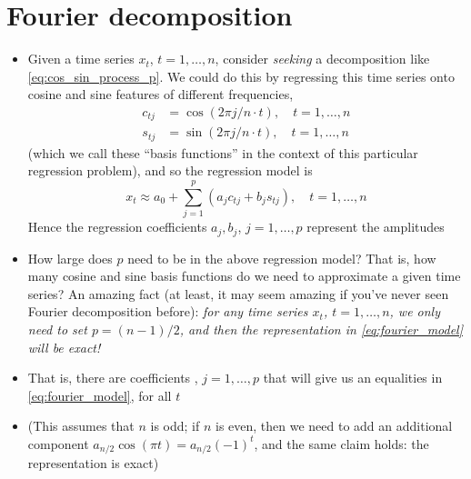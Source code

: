 \documentclass{article}
\begin{document}
\section{Fourier decomposition}

\begin{itemize}
\item Given a time series $x_t$, $t = 1,\dots,n$, consider \emph{seeking} a
  decomposition like \eqref{eq:cos_sin_process_p}. We could do this by
  regressing this time series onto cosine and sine features of different
  frequencies,  
  \begin{align*}
  c_{tj} &= \cos(2\pi j/n \cdot t), \quad t = 1,\dots,n \\
  s_{tj} &= \sin(2\pi j/n \cdot t), \quad t = 1,\dots,n
  \end{align*}
  (which we call these ``basis functions'' in the context of this particular
  regression problem), and so the regression model is 
  \begin{equation}
  \label{eq:fourier_model}
  x_t \approx a_0 + \sum_{j=1}^p (a_j c_{tj} + b_j s_{tj}), \quad t = 1,\dots,n 
  \end{equation}
  Hence the regression coefficients $a_j,b_j$, $j = 1,\dots,p$ represent the 
  amplitudes 

\item How large does $p$ need to be in the above regression model? That is, how
  many cosine and sine basis functions do we need to approximate a given time
  series? An amazing fact (at least, it may seem amazing if you've never seen
  Fourier decomposition before): \emph{for any time series $x_t$, $t =
    1,\dots,n$, we only need to set $p = (n-1)/2$, and then the representation
    in \eqref{eq:fourier_model} will be exact!}    

\item That is, there are coefficients , $j =
  1,\dots,p$ that will give us an equalities in \eqref{eq:fourier_model}, for
  all $t$  

\item (This assumes that $n$ is odd; if $n$ is even, then we need to add an
  additional component $a_{n/2} \cos(\pi t) = a_{n/2} (-1)^t$, and the same
  claim holds: the representation is exact)  


\end{itemize}
\end{document}
